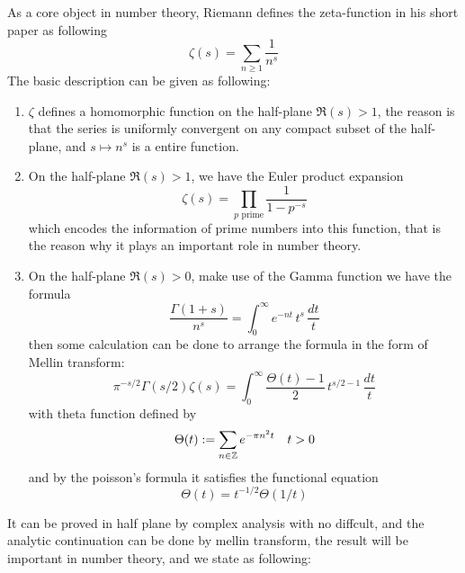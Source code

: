 As a core object in number theory, Riemann defines the zeta-function in his short paper \cite{Riemann} as following
\[\zeta(s) = \sum_{n \geq 1}\frac{1}{n^s}\]
The basic description can be given as following:
\begin{enumerate}
    \item \(\zeta\) defines a homomorphic function on the half-plane \(\Re(s) >1\), the reason is that the series is uniformly convergent on any compact subset of the half-plane, and \(s \mapsto n^s\) is a entire function.
    
    \item On the half-plane \(\Re(s) > 1\), we have the Euler product expansion
    \[\zeta(s) = \prod_{p \text{ prime}} \frac{1}{1 - p^{-s}}\]
    which encodes the information of prime numbers into this function, that is the reason why it plays an important role in number theory.

    \item On the half-plane \(\Re(s) > 0\), make use of the Gamma function we have the formula
    \[\frac{\Gamma(1+s)}{n^s} = \int_{0}^{\infty} e^{-nt}\, t^{s} \, \frac{dt}{t}\]
    then some calculation can be done to arrange the formula in the form of Mellin transform:
    \begin{equation} \label{integralrepofzeta}
        \pi^{-s/2} \Gamma(s/2) \zeta(s) =  \int_0^\infty \frac{\Theta(t) -1}{2} \, t^{s/2-1} \, \frac{dt}{t}
    \end{equation}
    with theta function defined by
    \[\Theta(t) := \sum_{n \in \mathbb{Z}}e^{-\pi n^2 t} \quad t>0 \]
    and by the poisson's formula it satisfies the functional equation 
    \begin{equation} \label{fctequationoftheta}
    \Theta(t) = t^{-1/2}\Theta(1/t)
    \end{equation}
\end{enumerate}

It can be proved in half plane by complex analysis with no diffcult, and the analytic continuation can be done by mellin transform, the result will be important in number theory, and we state as following:


